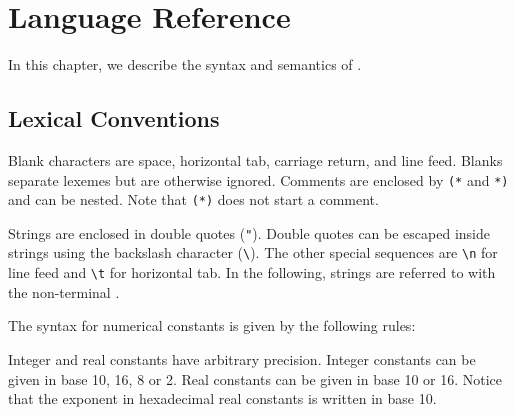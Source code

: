 \chapter{Language Reference}
\label{chap:syntaxref}

In this chapter, we describe the syntax and semantics of \whyml.

%

\section{Lexical Conventions}
\label{sec:lexer}

%
Blank characters are space, horizontal tab, carriage return,
and line feed. Blanks separate lexemes but are otherwise ignored.
%
Comments are enclosed by \texttt{(*} and \texttt{*)} and can be nested.
Note that \texttt{(*)} does not start a comment.

Strings are enclosed in double quotes (\verb!"!). Double quotes can be
escaped inside strings using the backslash character (\verb!\!).
The other special sequences are \verb!\n! for line feed and \verb!\t!
for horizontal tab.
In the following, strings are referred to with the non-terminal
\spacefalse.

The syntax for numerical constants is given by the following rules:
\begin{center}\end{center}
Integer and real constants have arbitrary precision.
Integer constants can be given in base 10, 16, 8 or 2.
Real constants can be given in base 10 or 16.
Notice that the exponent in hexadecimal real constants is written in base 10.


